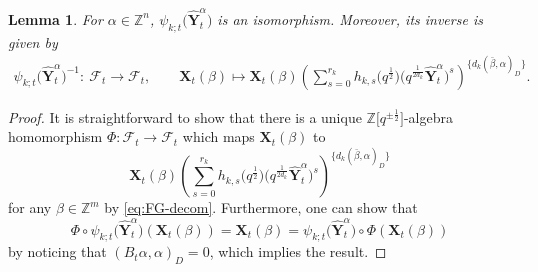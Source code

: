 \documentclass[pdftex]{sigma}
\newcommand{\Z}{\mathbb{Z}}
\numberwithin{equation}{section}
\newtheorem{Lemma}[Theorem]{Lemma}
\begin{document}
\begin{Lemma}
 For $\alpha\in \Z^n$, $\psi_{k;t}\bigl(\mathbf{\hat{Y}}_{t}^{\alpha}\bigr)$ is an isomorphism. Moreover, its inverse is given by
 \begin{align*}
 \psi_{k;t}\bigl(\mathbf{\hat{Y}}_{t}^{\alpha}\bigr)^{-1}\colon\ \mathcal{F}_t\to \mathcal{F}_t,\qquad
 \mathbf{X}_{t}(\beta)\mapsto\mathbf{X}_{t}(\beta)\left(\sum\limits_{s=0}^{r_k} h_{k,s}\bigl(q^{\frac{1}{2}}\bigr)\bigl(q^{\frac{1}{2d_{k}}}\mathbf{\hat{Y}}_{t}^{\alpha}\bigr)^{s}\right)^{\{d_{k}(\bar{\beta},\alpha)_D\}}.
\end{align*}
\end{Lemma}
\begin{proof}
 It is straightforward to show that there is a unique $\Z\big[q^{\pm\frac{1}{2}}\big]$-algebra homomorphism $\Phi\colon \mathcal{F}_t\to \mathcal{F}_t$ which maps $\mathbf{X}_t(\beta)$ to
 \[
 \mathbf{X}_{t}(\beta)\left(\sum\limits_{s=0}^{r_k} h_{k,s}\bigl(q^{\frac{1}{2}}\bigr)\bigl(q^{\frac{1}{2d_{k}}}\mathbf{\hat{Y}}_{t}^{\alpha}\bigr)^{s}\right)^{\{d_{k}(\bar{\beta},\alpha)_D\}}
 \]
  for any $\beta\in \Z^m$ by \eqref{eq:FG-decom}.
 Furthermore, one can show that
 \[
 \Phi\circ \psi_{k;t}\bigl(\mathbf{\hat{Y}}_{t}^{\alpha}\bigr)(\mathbf{X}_t(\beta))=\mathbf{X}_t(\beta)=\psi_{k;t}\bigl(\mathbf{\hat{Y}}_{t}^{\alpha}\bigr)\circ \Phi(\mathbf{X}_t(\beta))
 \]
 by noticing that $(B_t\alpha, \alpha)_D=0$, which implies the result.
\end{proof}
\end{document}
